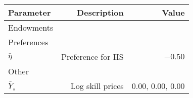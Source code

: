 \begin{tabular}{lrr}
\hline
Parameter & Description  & Value  \\ 
\hline
Endowments &   &   \\ 
Preferences &   &   \\ 
$\bar{\eta}$ & Preference for HS  & $-0.50$  \\ 
Other &   &   \\ 
$\bar{Y}_{s}$ & Log skill prices  & 0.00, 0.00, 0.00  \\ 
\hline
\end{tabular}%
